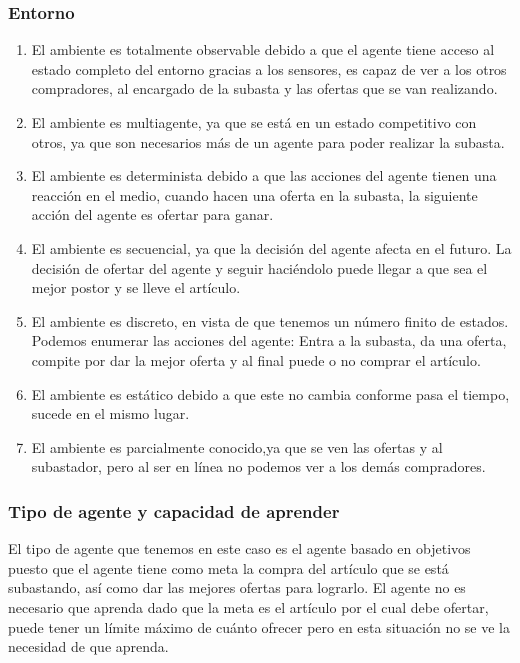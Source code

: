 \documentclass{article}
\begin{document}
            \subsubsection{Entorno}
                \begin{enumerate}
                    \item El ambiente es totalmente observable debido a que el agente tiene acceso al estado completo del entorno gracias a los sensores, es capaz de ver a los otros compradores, al encargado de la subasta y las ofertas que se van realizando.
                    \item El ambiente es multiagente, ya que se está en un estado competitivo con otros, ya que son necesarios más de un agente para poder realizar la subasta.
                    \item El ambiente es determinista debido a que las acciones del agente tienen una reacción en el medio, cuando hacen una oferta en la subasta, la siguiente acción del agente es ofertar para ganar.
                    \item El ambiente es secuencial, ya que la decisión del agente afecta en el futuro. La decisión de ofertar del agente y seguir haciéndolo puede llegar a que sea el mejor postor y se lleve el artículo.
                    \item El ambiente es discreto, en vista de que tenemos un número finito de estados. Podemos enumerar las acciones del agente: Entra a la subasta, da una oferta, compite por dar la mejor oferta y al final puede o no comprar el artículo.
                    \item El ambiente es estático debido a que este no cambia conforme pasa el tiempo, sucede en el mismo lugar.
                    \item El ambiente es parcialmente conocido,ya que se ven las ofertas y al subastador, pero al ser en línea no podemos ver a los demás compradores.
                \end{enumerate}

            \subsubsection{Tipo de agente y capacidad de aprender}
                El tipo de agente que tenemos en este caso es el agente basado en objetivos puesto que el agente tiene como meta la compra del artículo que se está subastando, así como dar las mejores ofertas para lograrlo. El agente no es necesario que aprenda dado que la meta es el artículo por el cual debe ofertar, puede tener un límite máximo de cuánto ofrecer pero en esta situación no se ve la necesidad de que aprenda.
\end{document}
